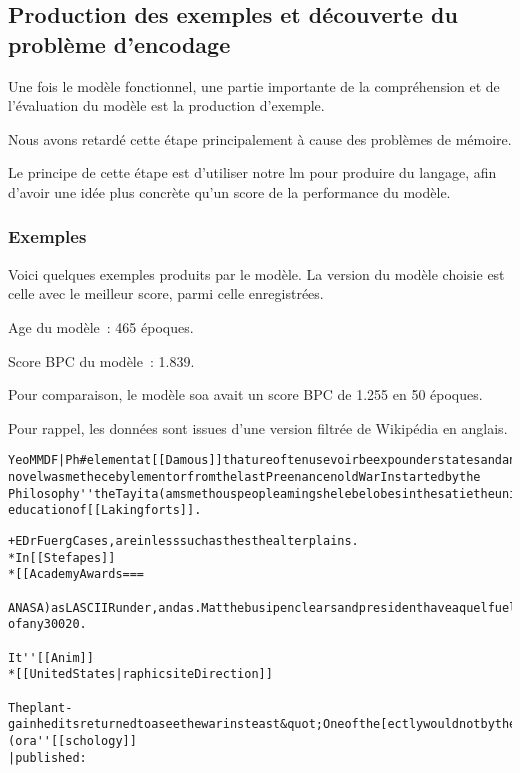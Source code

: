 \subsection{Production des exemples et découverte du problème d'encodage}
Une fois le modèle fonctionnel, une partie importante de la compréhension et de l'évaluation du modèle est la production d'exemple.

Nous avons retardé cette étape principalement à cause des problèmes de mémoire.

Le principe de cette étape est d'utiliser notre \gls{lm} pour produire du langage, afin d'avoir une idée plus concrète qu'un score de la performance du modèle.

\subsubsection{Exemples}
Voici quelques exemples produits par le modèle. 
La version du modèle choisie est celle avec le meilleur score, parmi celle enregistrées.

Age du modèle~: 465 époques.

Score BPC du modèle~: 1.839.

Pour comparaison, le modèle \gls{soa} avait un score BPC de 1.255 en 50 époques.

Pour rappel, les données sont issues d'une version filtrée de Wikipédia en anglais.

\begin{lstlisting}[caption={Exemple 1~: une suite de caractères à priori incompréhensibles.},label=gmsnn_ex1]
YeoMMDF|Ph#elementat[[Damous]]thatureoftenusevoirbeexpounderstatesandanumberofhisworkformembersothan novelwasmethecebylementorfromthelastPreenancenoldWarInstartedbythe Philosophy''theTayita(amsmethouspeopleamingshelebelobesinthesatietheuniversalistscientis educationof[[Lakingforts]].
\end{lstlisting}

\begin{lstlisting}[caption={Exemple 2~: des termes balisé comme dans le corpus d'origine, les crochets ouverts sont refermés.},label=gmsnn_ex2]
+EDrFuergCases,areinlesssuchasthesthealterplains.
*In[[Stefapes]]
*[[AcademyAwards===

ANASA)asLASCIIRunder,andas.MatthebusipenclearsandpresidenthaveaquelfuelsifthesearchfromAwarerLievol ofany30020.

It''[[Anim]]
*[[UnitedStates|raphicsiteDirection]]

Theplant-gainheditsreturnedtoaseethewarinsteast&quot;Oneofthe[ectlywouldnotbytheIntegrationscapianland](ora''[[schology]]
|published:
\end{lstlisting}

